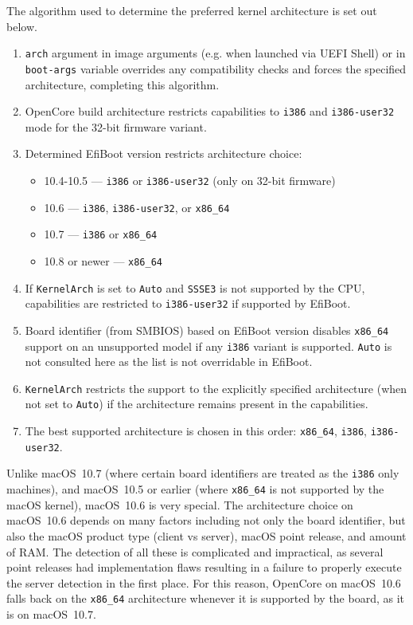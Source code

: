 \documentclass[]{article}
\providecommand{\tightlist}{%
  \setlength{\itemsep}{0pt}\setlength{\parskip}{0pt}}
\begin{document}
\begin{enumerate}
  The algorithm used to determine the preferred kernel architecture is set out below.

  \begin{enumerate}
    \tightlist
    \item \texttt{arch} argument in image arguments (e.g. when launched
    via UEFI Shell) or in \texttt{boot-args} variable overrides any compatibility
    checks and forces the specified architecture, completing this algorithm.
    \item OpenCore build architecture restricts capabilities to \texttt{i386}
      and \texttt{i386-user32} mode for the 32-bit firmware variant.
    \item Determined EfiBoot version restricts architecture choice:
      \begin{itemize}
      \item 10.4-10.5 --- \texttt{i386} or \texttt{i386-user32} (only on 32-bit firmware)
      \item 10.6 --- \texttt{i386}, \texttt{i386-user32}, or \texttt{x86\_64}
      \item 10.7 --- \texttt{i386} or \texttt{x86\_64}
      \item 10.8 or newer --- \texttt{x86\_64}
      \end{itemize}
    \item If \texttt{KernelArch} is set to \texttt{Auto} and \texttt{SSSE3}
      is not supported by the CPU, capabilities are restricted to \texttt{i386-user32}
      if supported by EfiBoot.
    \item Board identifier (from SMBIOS) based on EfiBoot version
      disables \texttt{x86\_64} support on an unsupported model
      if any \texttt{i386} variant is supported. \texttt{Auto}
      is not consulted here as the list is not overridable in EfiBoot.
    \item \texttt{KernelArch} restricts the support to the explicitly
      specified architecture (when not set to \texttt{Auto}) if
      the architecture remains present in the capabilities.
    \item The best supported architecture is chosen in this order:
      \texttt{x86\_64}, \texttt{i386}, \texttt{i386-user32}.
  \end{enumerate}

  Unlike macOS~10.7 (where certain board identifiers are treated as the \texttt{i386}
  only machines), and macOS~10.5 or earlier (where \texttt{x86\_64} is not supported
  by the macOS kernel), macOS~10.6 is very special. The architecture choice on macOS~10.6
  depends on many factors including not only the board identifier, but also the macOS
  product type (client vs server), macOS point release, and amount of RAM. The detection
  of all these is complicated and impractical, as several point releases had implementation
  flaws resulting in a failure to properly execute the server detection in the first place.
  For this reason, OpenCore on macOS~10.6 falls back on the \texttt{x86\_64}
  architecture whenever it is supported by the board, as it is on macOS~10.7.


\end{enumerate}
\end{document}

